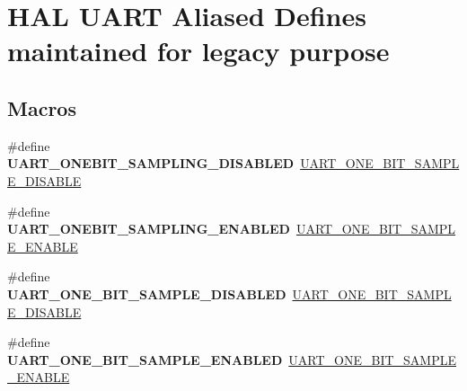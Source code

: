 \hypertarget{group___h_a_l___u_a_r_t___aliased___defines}{}\section{H\+AL U\+A\+RT Aliased Defines maintained for legacy purpose}
\label{group___h_a_l___u_a_r_t___aliased___defines}
\subsection*{Macros}
\begin{DoxyCompactItemize}
\item 
\mbox{\label{group___h_a_l___u_a_r_t___aliased___defines_gab24a7dd52e7b30408662b4d8abc23201}} 
\#define {\bfseries U\+A\+R\+T\+\_\+\+O\+N\+E\+B\+I\+T\+\_\+\+S\+A\+M\+P\+L\+I\+N\+G\+\_\+\+D\+I\+S\+A\+B\+L\+ED}~\hyperlink{group___u_a_r_t___one_bit___sampling_gadfcb0e9db2719321048b249b2c5cc15f}{U\+A\+R\+T\+\_\+\+O\+N\+E\+\_\+\+B\+I\+T\+\_\+\+S\+A\+M\+P\+L\+E\+\_\+\+D\+I\+S\+A\+B\+LE}
\item 
\mbox{\label{group___h_a_l___u_a_r_t___aliased___defines_gaee55ba79523b89ea4e6c18d7d45e310f}} 
\#define {\bfseries U\+A\+R\+T\+\_\+\+O\+N\+E\+B\+I\+T\+\_\+\+S\+A\+M\+P\+L\+I\+N\+G\+\_\+\+E\+N\+A\+B\+L\+ED}~\hyperlink{group___u_a_r_t___one_bit___sampling_gadcc0aed6e7a466da3c45363f69dcbfb6}{U\+A\+R\+T\+\_\+\+O\+N\+E\+\_\+\+B\+I\+T\+\_\+\+S\+A\+M\+P\+L\+E\+\_\+\+E\+N\+A\+B\+LE}
\item 
\mbox{\label{group___h_a_l___u_a_r_t___aliased___defines_gac3fb87f174fb4383fbc5f85e6cf2ff9f}} 
\#define {\bfseries U\+A\+R\+T\+\_\+\+O\+N\+E\+\_\+\+B\+I\+T\+\_\+\+S\+A\+M\+P\+L\+E\+\_\+\+D\+I\+S\+A\+B\+L\+ED}~\hyperlink{group___u_a_r_t___one_bit___sampling_gadfcb0e9db2719321048b249b2c5cc15f}{U\+A\+R\+T\+\_\+\+O\+N\+E\+\_\+\+B\+I\+T\+\_\+\+S\+A\+M\+P\+L\+E\+\_\+\+D\+I\+S\+A\+B\+LE}
\item 
\mbox{\label{group___h_a_l___u_a_r_t___aliased___defines_ga8ec1cb725dbf11a16e71c489fbe525bc}} 
\#define {\bfseries U\+A\+R\+T\+\_\+\+O\+N\+E\+\_\+\+B\+I\+T\+\_\+\+S\+A\+M\+P\+L\+E\+\_\+\+E\+N\+A\+B\+L\+ED}~\hyperlink{group___u_a_r_t___one_bit___sampling_gadcc0aed6e7a466da3c45363f69dcbfb6}{U\+A\+R\+T\+\_\+\+O\+N\+E\+\_\+\+B\+I\+T\+\_\+\+S\+A\+M\+P\+L\+E\+\_\+\+E\+N\+A\+B\+LE}

\end{DoxyCompactItemize}
